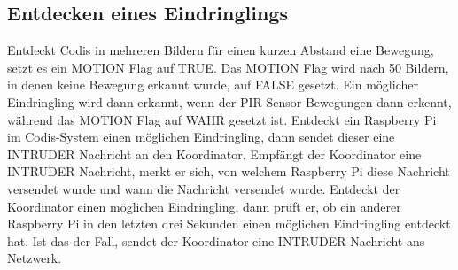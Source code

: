 \documentclass[journal]{IEEEtran}
\begin{document}
\subsection{Entdecken eines Eindringlings}

Entdeckt Codis in mehreren Bildern für einen kurzen Abstand eine Bewegung, setzt es ein \MakeUppercase{motion} Flag auf TRUE. Das \MakeUppercase{motion} Flag wird nach 50 Bildern, in denen keine Bewegung erkannt wurde, auf FALSE gesetzt. Ein möglicher Eindringling wird dann erkannt, wenn der PIR-Sensor Bewegungen dann erkennt, während das \MakeUppercase{motion} Flag auf WAHR gesetzt ist. Entdeckt ein Raspberry Pi im Codis-System einen möglichen Eindringling, dann sendet dieser eine \MakeUppercase{intruder} Nachricht an den Koordinator. Empfängt der Koordinator eine \MakeUppercase{intruder} Nachricht, merkt er sich, von welchem Raspberry Pi diese Nachricht versendet wurde und wann die Nachricht versendet wurde. Entdeckt der Koordinator einen möglichen Eindringling, dann prüft er, ob ein anderer Raspberry Pi in den letzten drei Sekunden einen möglichen Eindringling entdeckt hat. Ist das der Fall, sendet der Koordinator eine \MakeUppercase{intruder} Nachricht ans Netzwerk.
\end{document}

